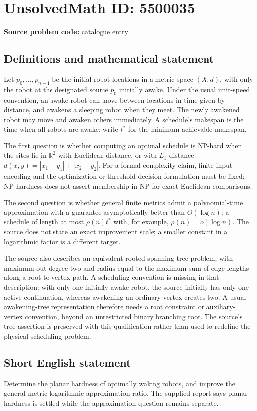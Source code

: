 \documentclass[11pt]{article}
\newcommand{\R}{\mathbb{R}}
\begin{document}
\section*{UnsolvedMath ID: 5500035}
\textbf{Source problem code:} catalogue entry
\subsection{Definitions and mathematical statement}
Let $p_0,\ldots,p_{n-1}$ be the initial robot locations in a metric space $(X,d)$, with only the robot at the designated source $p_0$ initially awake. Under the usual unit-speed convention, an awake robot can move between locations in time given by distance, and awakens a sleeping robot when they meet. The newly awakened robot may move and awaken others immediately. A schedule's makespan is the time when all robots are awake; write $t^*$ for the minimum achievable makespan.

The first question is whether computing an optimal schedule is NP-hard when the sites lie in $\R^2$ with Euclidean distance, or with $L_1$ distance $d(x,y)=|x_1-y_1|+|x_2-y_2|$. For a formal complexity claim, finite input encoding and the optimization or threshold-decision formulation must be fixed; NP-hardness does not assert membership in NP for exact Euclidean comparisons.

The second question is whether general finite metrics admit a polynomial-time approximation with a guarantee asymptotically better than $O(\log n)$: a schedule of length at most $\rho(n)t^*$ with, for example, $\rho(n)=o(\log n)$. The source does not state an exact improvement scale; a smaller constant in a logarithmic factor is a different target.

The source also describes an equivalent rooted spanning-tree problem, with maximum out-degree two and radius equal to the maximum sum of edge lengths along a root-to-vertex path. A scheduling convention is missing in that description: with only one initially awake robot, the source initially has only one active continuation, whereas awakening an ordinary vertex creates two. A usual awakening-tree representation therefore needs a root constraint or auxiliary-vertex convention, beyond an unrestricted binary branching root. The source's tree assertion is preserved with this qualification rather than used to redefine the physical scheduling problem.
\subsection{Short English statement}
Determine the planar hardness of optimally waking robots, and improve the general-metric logarithmic approximation ratio. The supplied report says planar hardness is settled while the approximation question remains separate.
\end{document}
